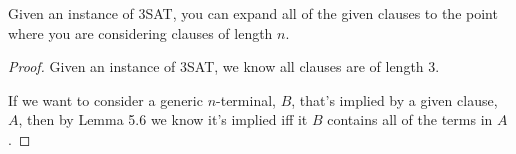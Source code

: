 \documentclass[manuscript]{acmart}
\begin{document}








            
            
            



    \begin{lemma}
        Given an instance of 3SAT, you can expand all of the given clauses
        to the point where you are considering clauses of length $n$.
    \end{lemma}
    \begin{proof}
        Given an instance of 3SAT, we know all clauses are of length 3.

        If we want to consider a generic $n$-terminal, $B$, that's implied by a
        given clause, $A$, then by Lemma 5.6 we know it's implied iff it $B$ 
        contains all of the terms in $A$.
    \end{proof}
\end{document}
